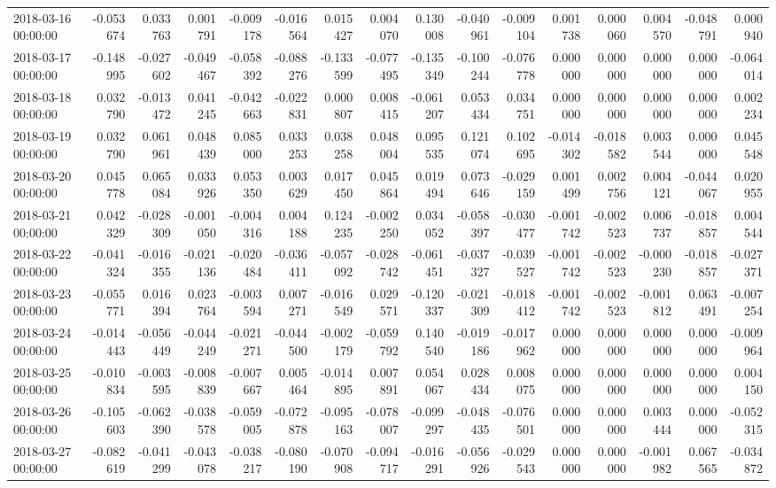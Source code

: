 \begin{tabular}{lrrrrrrrrrrrrrrr}
2018-03-16 00:00:00 & -0.053674 & 0.033763 & 0.001791 & -0.009178 & -0.016564 & 0.015427 & 0.004070 & 0.130008 & -0.040961 & -0.009104 & 0.001738 & 0.000060 & 0.004570 & -0.048791 & 0.000940 \\
2018-03-17 00:00:00 & -0.148995 & -0.027602 & -0.049467 & -0.058392 & -0.088276 & -0.133599 & -0.077495 & -0.135349 & -0.100244 & -0.076778 & 0.000000 & 0.000000 & 0.000000 & 0.000000 & -0.064014 \\
2018-03-18 00:00:00 & 0.032790 & -0.013472 & 0.041245 & -0.042663 & -0.022831 & 0.000807 & 0.008415 & -0.061207 & 0.053434 & 0.034751 & 0.000000 & 0.000000 & 0.000000 & 0.000000 & 0.002234 \\
2018-03-19 00:00:00 & 0.032790 & 0.061961 & 0.048439 & 0.085000 & 0.033253 & 0.038258 & 0.048004 & 0.095535 & 0.121074 & 0.102695 & -0.014302 & -0.018582 & 0.003544 & 0.000000 & 0.045548 \\
2018-03-20 00:00:00 & 0.045778 & 0.065084 & 0.033926 & 0.053350 & 0.003629 & 0.017450 & 0.045864 & 0.019494 & 0.073646 & -0.029159 & 0.001499 & 0.002756 & 0.004121 & -0.044067 & 0.020955 \\
2018-03-21 00:00:00 & 0.042329 & -0.028309 & -0.001050 & -0.004316 & 0.004188 & 0.124235 & -0.002250 & 0.034052 & -0.058397 & -0.030477 & -0.001742 & -0.002523 & 0.006737 & -0.018857 & 0.004544 \\
2018-03-22 00:00:00 & -0.041324 & -0.016355 & -0.021136 & -0.020484 & -0.036411 & -0.057092 & -0.028742 & -0.061451 & -0.037327 & -0.039527 & -0.001742 & -0.002523 & -0.000230 & -0.018857 & -0.027371 \\
2018-03-23 00:00:00 & -0.055771 & 0.016394 & 0.023764 & -0.003594 & 0.007271 & -0.016549 & 0.029571 & -0.120337 & -0.021309 & -0.018412 & -0.001742 & -0.002523 & -0.001812 & 0.063491 & -0.007254 \\
2018-03-24 00:00:00 & -0.014443 & -0.056449 & -0.044249 & -0.021271 & -0.044500 & -0.002179 & -0.059792 & 0.140540 & -0.019186 & -0.017962 & 0.000000 & 0.000000 & 0.000000 & 0.000000 & -0.009964 \\
2018-03-25 00:00:00 & -0.010834 & -0.003595 & -0.008839 & -0.007667 & 0.005464 & -0.014895 & 0.007891 & 0.054067 & 0.028434 & 0.008075 & 0.000000 & 0.000000 & 0.000000 & 0.000000 & 0.004150 \\
2018-03-26 00:00:00 & -0.105603 & -0.062390 & -0.038578 & -0.059005 & -0.072878 & -0.095163 & -0.078007 & -0.099297 & -0.048435 & -0.076501 & 0.000000 & 0.000000 & 0.003444 & 0.000000 & -0.052315 \\
2018-03-27 00:00:00 & -0.082619 & -0.041299 & -0.043078 & -0.038217 & -0.080190 & -0.070908 & -0.094717 & -0.016291 & -0.056926 & -0.029543 & 0.000000 & 0.000000 & -0.001982 & 0.067565 & -0.034872 \\

\end{tabular}
